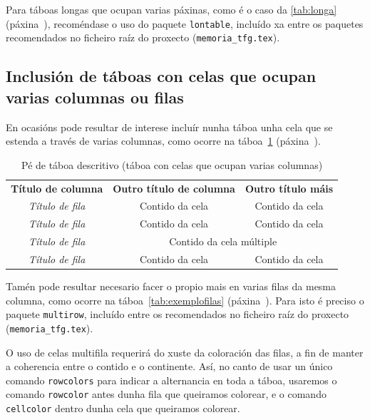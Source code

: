 Para táboas longas que ocupan varias páxinas, como é o caso da \ref{tab:longa}
(páxina~\pageref{tab:longa}), recoméndase o uso do paquete \lstinline{lontable},
incluído xa entre os paquetes recomendados no ficheiro raíz do proxecto
(\verb+memoria_tfg.tex+).



\subsection{Inclusión de táboas con celas que ocupan varias columnas ou filas}

En ocasións pode resultar de interese incluír nunha táboa unha cela que se estenda
a través de varias columnas, como ocorre na táboa~\ref{tab:exemplocolumnas}
(páxina~\pageref{tab:exemplocolumnas}).

\begin{table}[hp!]
  \centering
  \begin{tabular}{c|c|c}
  \rowcolor{udcpink!25}
  \multicolumn{3}{c}{\textbf{Cela en varias columnas}} \\\hline
  \rowcolor{udcpink!25}
  \textbf{Título de columna} & \textbf{Outro título de columna} & \textbf{Outro título máis} \\\hline
  \textit{Título de fila}    & Contido da cela                  & Contido da cela \\
  \textit{Título de fila}    & Contido da cela                  & Contido da cela \\
  \textit{Título de fila}    & \multicolumn{2}{c}{Contido da cela múltiple} \\
  \textit{Título de fila}    & Contido da cela                  & Contido da cela \\
  \end{tabular}
  \caption{Pé de táboa descritivo (táboa con celas que ocupan varias columnas)}
  \label{tab:exemplocolumnas}
\end{table}

Tamén pode resultar necesario facer o propio mais en varias filas da mesma columna,
como ocorre na táboa~\ref{tab:exemplofilas} (páxina~\pageref{tab:exemplofilas}).
Para isto é preciso o paquete \lstinline{multirow}, incluído entre os recomendados no
ficheiro raíz do proxecto (\verb+memoria_tfg.tex+).

O uso de celas multifila requerirá do xuste da coloración das filas, a fin de manter
a coherencia entre o contido e o continente. Así, no canto de usar un único comando
\verb+rowcolors+ para indicar a alternancia en toda a táboa, usaremos o comando
\verb+rowcolor+ antes dunha fila que queiramos colorear, e o comando \verb+cellcolor+
dentro dunha cela que queiramos colorear.


